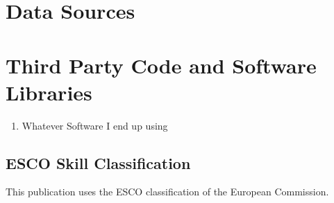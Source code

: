 \begin{appendices}
  \section*{Data Sources}
  

  \section*{Third Party Code and Software Libraries}\label{appendix:software-libaries}

  \begin{enumerate}
    \item Whatever Software I end up using
  \end{enumerate}

  \subsection{ESCO Skill Classification}
  This publication uses the ESCO classification of the European Commission.
\end{appendices}